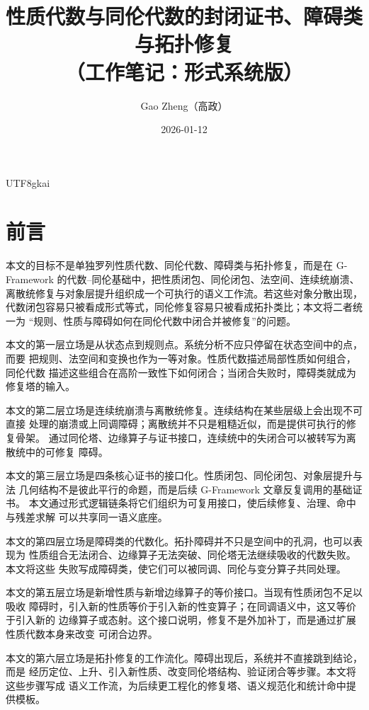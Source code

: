 \documentclass[12pt]{article}
\newcommand{\GFramework}{\textsf{G-Framework}}
\begin{document}
\begin{CJK*}{UTF8}{gkai}

\title{性质代数与同伦代数的封闭证书、障碍类与拓扑修复\\（工作笔记：形式系统版）}
\author{Gao Zheng（高政）}
\date{2026-01-12}
\maketitle

\section*{前言}

本文的目标不是单独罗列性质代数、同伦代数、障碍类与拓扑修复，而是在
\GFramework{} 的代数--同伦基础中，把性质闭包、同伦闭包、法空间、连续统崩溃、
离散统修复与对象层提升组织成一个可执行的语义工作流。若这些对象分散出现，
代数闭包容易只被看成形式等式，同伦修复容易只被看成拓扑类比；本文将二者统一为
“规则、性质与障碍如何在同伦代数中闭合并被修复”的问题。

本文的第一层立场是从状态点到规则点。系统分析不应只停留在状态空间中的点，而要
把规则、法空间和变换也作为一等对象。性质代数描述局部性质如何组合，同伦代数
描述这些组合在高阶一致性下如何闭合；当闭合失败时，障碍类就成为修复塔的输入。

本文的第二层立场是连续统崩溃与离散统修复。连续结构在某些层级上会出现不可直接
处理的崩溃或上同调障碍；离散统并不只是粗糙近似，而是提供可执行的修复骨架。
通过同伦塔、边缘算子与证书接口，连续统中的失闭合可以被转写为离散统中的可修复
障碍。

本文的第三层立场是四条核心证书的接口化。性质闭包、同伦闭包、对象层提升与法
几何结构不是彼此平行的命题，而是后续 G-Framework 文章反复调用的基础证书。
本文通过形式逻辑链条将它们组织为可复用接口，使后续修复、治理、命中与残差求解
可以共享同一语义底座。

本文的第四层立场是障碍类的代数化。拓扑障碍并不只是空间中的孔洞，也可以表现为
性质组合无法闭合、边缘算子无法突破、同伦塔无法继续吸收的代数失败。本文将这些
失败写成障碍类，使它们可以被同调、同伦与变分算子共同处理。

本文的第五层立场是新增性质与新增边缘算子的等价接口。当现有性质闭包不足以吸收
障碍时，引入新的性质等价于引入新的性变算子；在同调语义中，这又等价于引入新的
边缘算子或态射。这个接口说明，修复不是外加补丁，而是通过扩展性质代数本身来改变
可闭合边界。

本文的第六层立场是拓扑修复的工作流化。障碍出现后，系统并不直接跳到结论，而是
经历定位、上升、引入新性质、改变同伦塔结构、验证闭合等步骤。本文将这些步骤写成
语义工作流，为后续更工程化的修复塔、语义规范化和统计命中提供模板。


\end{CJK*}
\end{document}
